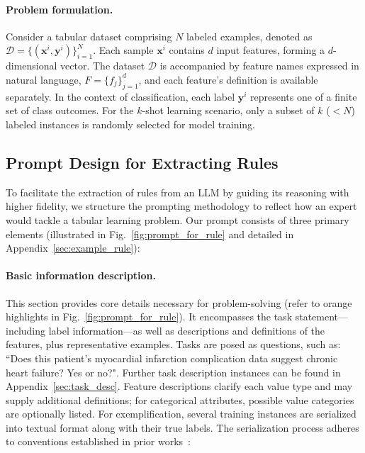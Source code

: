 \vspace*{-0.12in}
\paragraph{Problem formulation.} Consider a tabular dataset comprising $N$ labeled examples, denoted as $\mathcal{D} = \{(\mathbf{x}^i, \mathbf{y}^i)\}_{i=1}^{N}$. Each sample $\mathbf{x}^i$ contains $d$ input features, forming a $d$-dimensional vector. The dataset $\mathcal{D}$ is accompanied by feature names expressed in natural language, $F = \{f_j\}_{j=1}^{d}$, and each feature's definition is available separately. In the context of classification, each label $\mathbf{y}^i$ represents one of a finite set of class outcomes. For the $k$-shot learning scenario, only a subset of $k$ ($<N$) labeled instances is randomly selected for model training.

\subsection{Prompt Design for Extracting Rules}
\label{Sec:prompt_design}
To facilitate the extraction of rules from an LLM by guiding its reasoning with higher fidelity, we structure the prompting methodology to reflect how an expert would tackle a tabular learning problem. Our prompt consists of three primary elements (illustrated in Fig.~\ref{fig:prompt_for_rule} and detailed in Appendix~\ref{sec:example_rule}):

\vspace*{-0.12in}
\paragraph{Basic information description.} This section provides core details necessary for problem-solving (refer to orange highlights in Fig.~\ref{fig:prompt_for_rule}). It encompasses the task statement—including label information—as well as descriptions and definitions of the features, plus representative examples. Tasks are posed as questions, such as: ``Does this patient's myocardial infarction complication data suggest chronic heart failure? Yes or no?". Further task description instances can be found in Appendix~\ref{sec:task_desc}. Feature descriptions clarify each value type and may supply additional definitions; for categorical attributes, possible value categories are optionally listed. For exemplification, several training instances are serialized into textual format along with their true labels. The serialization process adheres to conventions established in prior works~\cite{dinh2022lift,hegselmann2023tabllm}:

